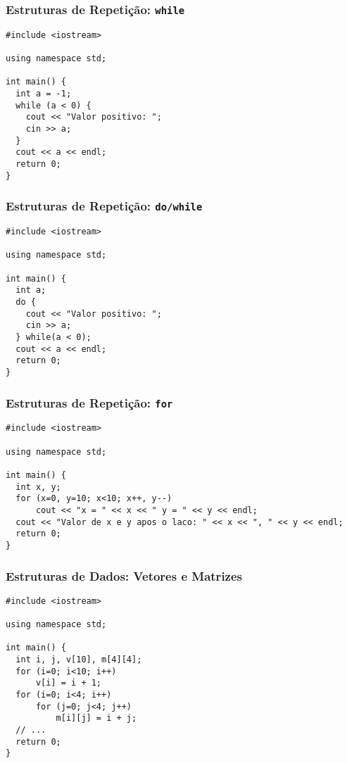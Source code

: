 \documentclass[aspectratio=169]{beamer}
\begin{document}
\begin{frame}[fragile]\frametitle{Estruturas de Repetição: \texttt{while}}
\begin{lstlisting}
#include <iostream>

using namespace std;

int main() {
  int a = -1;
  while (a < 0) {
    cout << "Valor positivo: ";
    cin >> a;
  }
  cout << a << endl;
  return 0;
}
\end{lstlisting}
\end{frame}

\begin{frame}[fragile]\frametitle{Estruturas de Repetição: \texttt{do/while}}
\begin{lstlisting}
#include <iostream>

using namespace std;

int main() {
  int a;
  do {
    cout << "Valor positivo: ";
    cin >> a;
  } while(a < 0);
  cout << a << endl;
  return 0;
}
\end{lstlisting}
\end{frame}

\begin{frame}[fragile]\frametitle{Estruturas de Repetição: \texttt{for}}
\begin{lstlisting}
#include <iostream>

using namespace std;

int main() {
  int x, y;
  for (x=0, y=10; x<10; x++, y--)
      cout << "x = " << x << " y = " << y << endl;
  cout << "Valor de x e y apos o laco: " << x << ", " << y << endl;
  return 0;
}
\end{lstlisting}
\end{frame}

\begin{frame}[fragile]\frametitle{Estruturas de Dados: Vetores e Matrizes}
\begin{lstlisting}
#include <iostream>

using namespace std;

int main() {
  int i, j, v[10], m[4][4];
  for (i=0; i<10; i++)
      v[i] = i + 1;
  for (i=0; i<4; i++)
      for (j=0; j<4; j++)
          m[i][j] = i + j;
  // ...
  return 0;
}
\end{lstlisting}
\end{frame}
\end{document}
